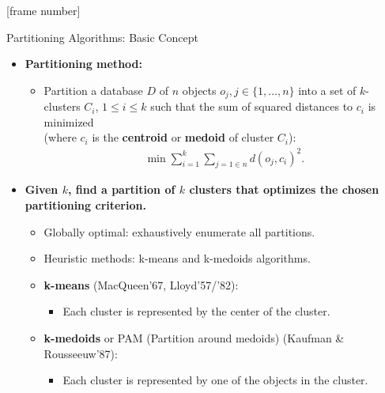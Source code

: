 \documentclass[aspectratio=169,t,xcolor=dvipsnames]{beamer}
\begin{document}
  {
    [frame number]
    \begin{frame}{Partitioning Algorithms: Basic Concept}
        \begin{itemize}
          \item \textbf{Partitioning method:}
          \begin{itemize}
            \item Partition a database $D$ of $n$ objects $o_j, j \in \{1, \ldots, n\}$ into a set of $k$-clusters $C_i$, $1 \leq i \leq k$ such that the sum of squared distances to $c_i$ is minimized \\ (where $c_i$ is the \textbf{\color{airforceblue}centroid} or \textbf{\color{airforceblue}medoid} of cluster $C_i$):
            \begin{align}
              \min \sum_{i=1}^{k} \sum_{j=1 \in n} d(o_j,c_i)^2.
            \end{align}
          \end{itemize}
          \item \textbf{Given $k$, find a partition of $k$ clusters that optimizes the chosen partitioning criterion.}
          \begin{itemize}
            \item Globally optimal: exhaustively enumerate all partitions.
            \item Heuristic methods: k-means and k-medoids algorithms.
            \item \textbf{\color{airforceblue}k-means} (MacQueen'67, Lloyd'57/'82):
            \begin{itemize}
              \item Each cluster is represented by the center of the cluster.
            \end{itemize}
            \item \textbf{\color{airforceblue}k-medoids} or PAM (Partition around medoids) (Kaufman \& Rousseeuw'87):
            \begin{itemize}
              \item Each cluster is represented by one of the objects in the cluster.
            \end{itemize}
          \end{itemize}
        \end{itemize}
    \end{frame}
  }
\end{document}
